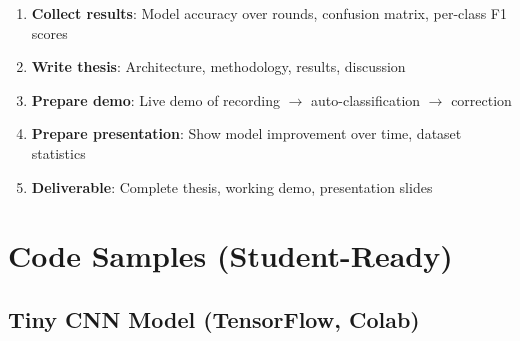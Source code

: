 \documentclass[11pt,a4paper]{article}
\begin{document}
\begin{enumerate}[leftmargin=*,noitemsep]
    \item \textbf{Collect results}: Model accuracy over rounds, confusion matrix, per-class F1 scores
    \item \textbf{Write thesis}: Architecture, methodology, results, discussion
    \item \textbf{Prepare demo}: Live demo of recording $\rightarrow$ auto-classification $\rightarrow$ correction
    \item \textbf{Prepare presentation}: Show model improvement over time, dataset statistics
    \item \textbf{Deliverable}: Complete thesis, working demo, presentation slides
\end{enumerate}

\section{Code Samples (Student-Ready)}

\subsection{Tiny CNN Model (TensorFlow, Colab)}
\end{document}
